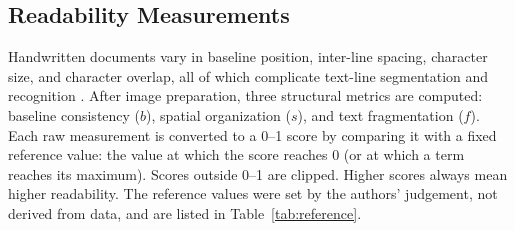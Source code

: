 
\subsection{Readability Measurements}

Handwritten documents vary in baseline position, inter-line spacing,
character size, and character overlap, all of which complicate text-line
segmentation and recognition
\citep{papavassiliou2010segmentation, rabaev2026baseline}. After image
preparation, three structural metrics are computed: baseline consistency
($b$), spatial organization ($s$), and text fragmentation ($f$). Each raw
measurement is converted to a 0--1 score by comparing it with a fixed
reference value: the value at which the score reaches 0 (or at which a term
reaches its maximum). Scores outside 0--1 are clipped. Higher scores always
mean higher readability. The reference values were set by the authors'
judgement, not derived from data, and are listed in Table~\ref{tab:reference}.


